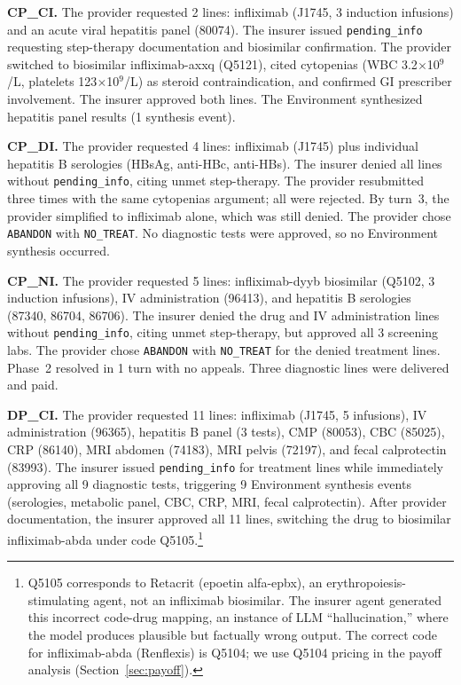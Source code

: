 \textbf{CP\_CI.} The provider requested 2 lines: infliximab (J1745, 3 induction infusions) and an acute viral hepatitis panel (80074). The insurer issued \texttt{pending\_info} requesting step-therapy documentation and biosimilar confirmation. The provider switched to biosimilar infliximab-axxq (Q5121), cited cytopenias (WBC 3.2$\times$10$^9$/L, platelets 123$\times$10$^9$/L) as steroid contraindication, and confirmed GI prescriber involvement. The insurer approved both lines. The Environment synthesized hepatitis panel results (1 synthesis event).

\textbf{CP\_DI.} The provider requested 4 lines: infliximab (J1745) plus individual hepatitis B serologies (HBsAg, anti-HBc, anti-HBs). The insurer denied all lines without \texttt{pending\_info}, citing unmet step-therapy. The provider resubmitted three times with the same cytopenias argument; all were rejected. By turn~3, the provider simplified to infliximab alone, which was still denied. The provider chose \texttt{ABANDON} with \texttt{NO\_TREAT}. No diagnostic tests were approved, so no Environment synthesis occurred.

\textbf{CP\_NI.} The provider requested 5 lines: infliximab-dyyb biosimilar (Q5102, 3 induction infusions), IV administration (96413), and hepatitis B serologies (87340, 86704, 86706). The insurer denied the drug and IV administration lines without \texttt{pending\_info}, citing unmet step-therapy, but approved all 3 screening labs. The provider chose \texttt{ABANDON} with \texttt{NO\_TREAT} for the denied treatment lines. Phase~2 resolved in 1 turn with no appeals. Three diagnostic lines were delivered and paid.

\textbf{DP\_CI.} The provider requested 11 lines: infliximab (J1745, 5 infusions), IV administration (96365), hepatitis B panel (3 tests), CMP (80053), CBC (85025), CRP (86140), MRI abdomen (74183), MRI pelvis (72197), and fecal calprotectin (83993). The insurer issued \texttt{pending\_info} for treatment lines while immediately approving all 9 diagnostic tests, triggering 9 Environment synthesis events (serologies, metabolic panel, CBC, CRP, MRI, fecal calprotectin). After provider documentation, the insurer approved all 11 lines, switching the drug to biosimilar infliximab-abda under code Q5105.\footnote{Q5105 corresponds to Retacrit (epoetin alfa-epbx), an erythropoiesis-stimulating agent, not an infliximab biosimilar. The insurer agent generated this incorrect code-drug mapping, an instance of LLM ``hallucination,'' where the model produces plausible but factually wrong output. The correct code for infliximab-abda (Renflexis) is Q5104; we use Q5104 pricing in the payoff analysis (Section~\ref{sec:payoff}).}

